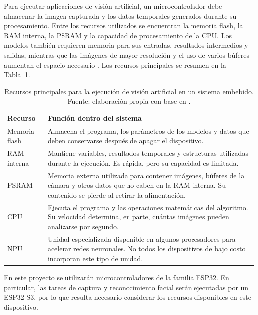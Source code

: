 Para ejecutar aplicaciones de visión artificial, un microcontrolador debe
almacenar la imagen capturada y los datos temporales generados durante su
procesamiento. Entre los recursos utilizados se encuentran la memoria flash, la
RAM interna, la PSRAM y la capacidad de procesamiento de la CPU. Los modelos
también requieren memoria para sus entradas, resultados intermedios y salidas,
mientras que las imágenes de mayor resolución y el uso de varios búferes
aumentan el espacio necesario \cite{ESPDLModelExecution,ESP32Camera}. Los
recursos principales se resumen en la
Tabla~\ref{tab:recursos_vision_embebida}.

\begin{table}[H]
    \centering
    \caption{Recursos principales para la ejecución de visión artificial en un
    sistema embebido. Fuente: elaboración propia con base en
    \cite{TinyMLReview2022,ESPDLModelExecution,ESP32Camera}.}
    \label{tab:recursos_vision_embebida}
    \begin{tabularx}{\textwidth}{p{} X}
        \toprule
        \textbf{Recurso} & \textbf{Función dentro del sistema} \\
        \midrule
        Memoria flash & Almacena el programa, los parámetros de los modelos y
        datos que deben conservarse después de apagar el dispositivo. \\
        RAM interna & Mantiene variables, resultados temporales y estructuras
        utilizadas durante la ejecución. Es rápida, pero su capacidad es
        limitada. \\
        PSRAM & Memoria externa utilizada para contener imágenes, búferes de la
        cámara y otros datos que no caben en la RAM interna. Su contenido se
        pierde al retirar la alimentación. \\
        CPU & Ejecuta el programa y las operaciones matemáticas del algoritmo.
        Su velocidad determina, en parte, cuántas imágenes pueden analizarse por
        segundo. \\
        NPU & Unidad especializada disponible en algunos procesadores para
        acelerar redes neuronales. No todos los dispositivos de bajo costo
        incorporan este tipo de unidad. \\
        \bottomrule
    \end{tabularx}
\end{table}

En este proyecto se utilizarán microcontroladores de la familia ESP32. En
particular, las tareas de captura y reconocimiento facial serán ejecutadas por
un ESP32-S3, por lo que resulta necesario considerar los recursos disponibles
en este dispositivo.


